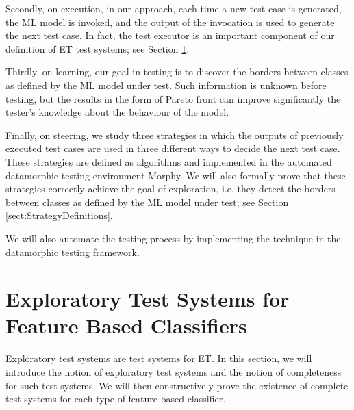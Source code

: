 \documentclass[preprint,1p,authoryear,times]{elsarticle}
\begin{document}
Secondly, on execution, in our approach, each time a new test case is generated, the ML model is invoked, and the output of the invocation is used to generate the next test case. In fact, the test executor is an important component of our definition of ET test systems; see Section \ref{sec:TestSystem}.  

Thirdly, on learning, our goal in testing is to discover the borders between classes as defined by the ML model under test. Such information is unknown before testing, but the results in the form of Pareto front can improve significantly the tester's knowledge about the behaviour of the model.

 

Finally, on steering, we study three strategies in which the outputs of previously executed test cases are used in three different ways to decide the next test case. These strategies are defined as algorithms and implemented in the automated datamorphic testing environment Morphy. We will also formally prove that these strategies correctly achieve the goal of exploration, i.e. they detect the borders between classes as defined by the ML model under test; see Section \ref{sect:StrategyDefinitions}. 

We will also automate the testing process by implementing the technique in the datamorphic testing framework. 

\section{Exploratory Test Systems for Feature Based Classifiers}\label{sec:TestSystem}

Exploratory test systems are test systems for ET. In this section, we will introduce the notion of exploratory test systems and the notion of completeness for such test systems. We will then constructively prove the existence of complete test systems for each type of feature based classifier. 
\end{document}
